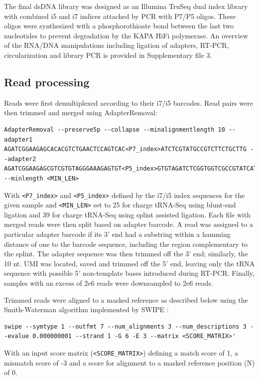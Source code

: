 \documentclass[9pt,lineno]{elife}
\begin{document}
The final dsDNA library was designed as an Illumina TruSeq dual index library with combined i5 and i7 indices attached by PCR with P7/P5 oligos.
These oligos were synthesized with a phosphorothioate bond between the last two nucleotides to prevent degradation by the KAPA HiFi polymerase.
An overview of the RNA/DNA manipulations including ligation of adapters, RT-PCR, circularization and library PCR is provided in Supplementary file 3.



\subsection{Read processing}
Reads were first demultiplexed according to their i7/i5 barcodes.
Read pairs were then trimmed and merged using AdapterRemoval:
\begin{lstlisting}
AdapterRemoval --preserve5p --collapse --minalignmentlength 10 --adapter1 AGATCGGAAGAGCACACGTCTGAACTCCAGTCAC<P7_index>ATCTCGTATGCCGTCTTCTGCTTG --adapter2 AGATCGGAAGAGCGTCGTGTAGGGAAAGAGTGT<P5_index>GTGTAGATCTCGGTGGTCGCCGTATCATT --minlength <MIN_LEN>
\end{lstlisting}
With \verb|<P7_index>| and \verb|<P5_index>| defined by the i7/i5 index sequences for the given sample and \verb|<MIN_LEN>| set to 25 for charge tRNA-Seq using blunt-end ligation and 39 for charge tRNA-Seq using splint assisted ligation.
Each file with merged reads were then split based on adapter barcode.
A read was assigned to a particular adapter barcode if its 3’ end had a substring within a hamming distance of one to the barcode sequence, including the region complementary to the splint.
The adapter sequence was then trimmed off the 3’ end; similarly, the 10 nt. UMI was located, saved and trimmed off the 5’ end, leaving only the tRNA sequence with possible 5’ non-template bases introduced during RT-PCR.
Finally, samples with an excess of 2e6 reads were downsampled to 2e6 reads.

Trimmed reads were aligned to a masked reference as described below using the Smith-Waterman algorithm implemented by SWIPE \citep{Rognes2011-iu}:
\begin{lstlisting}
swipe --symtype 1 --outfmt 7 --num_alignments 3 --num_descriptions 3 --evalue 0.000000001 --strand 1 -G 6 -E 3 --matrix <SCORE_MATRIX>'
\end{lstlisting}
With an input score matrix (\verb|<SCORE_MATRIX>|) defining a match score of 1, a mismatch score of -3 and a score for alignment to a masked reference position (N) of 0.
\end{document}

